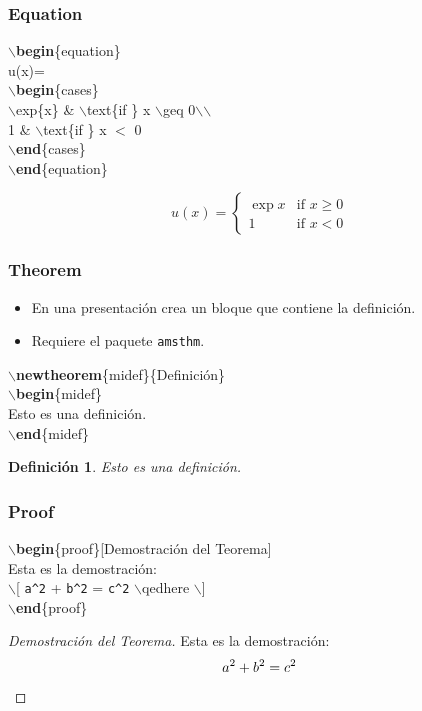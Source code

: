 \documentclass[aspectratio=1610]{beamer}%
\begin{document}
\begin{frame}[fragile]
\frametitle{\textbf{Equation}}
\justifying
 \begin{block}{}
$\backslash$\textbf{begin}\{equation\}\\
u(x)=\\
$\backslash$\textbf{begin}\{cases\}\\
$\backslash$exp\{x\}    \& $\backslash$text\{if \} x $\backslash$geq 0$\backslash$$\backslash$\\
 1 \& $\backslash$text\{if \} x $<$ 0\\
 $\backslash$\textbf{end}\{cases\}\\
$\backslash$\textbf{end}\{equation\}

\end{block}
\begin{equation}
u(x)=
\begin{cases}
\exp{x}    & \text{if } x \geq 0\\
 1 & \text{if } x < 0
 \end{cases}
\end{equation}
\end{frame}

\begin{frame}[fragile]
\frametitle{\textbf{Theorem}}
\justifying
 \begin{itemize}\justifying
  \item En una presentación crea un bloque que contiene la definición.
  \item Requiere el paquete \texttt{amsthm}.
\end{itemize}

\begin{block}{}
$\backslash$\textbf{newtheorem}\{midef\}\{Definición\}\\
$\backslash$\textbf{begin}\{midef\}\\
Esto es una definición.    \\
$\backslash$\textbf{end}\{midef\}
\end{block}

\newtheorem{midef}{Definición}
\begin{midef}
Esto es una definición.    
\end{midef}
\end{frame}

\begin{frame}[fragile]
\frametitle{\textbf{Proof}}
\justifying
 \begin{block}{}
$\backslash$\textbf{begin}\{proof\}[Demostración del Teorema]\\
    Esta es la demostración:\\
    $\backslash$[ \verb+a^2+ + \verb+b^2+ = \verb+c^2+ $\backslash$qedhere $\backslash$]\\
$\backslash$\textbf{end}\{proof\}
\end{block}
\begin{proof}[Demostración del Teorema]
    Esta es la demostración:
    \[ a^2 + b^2 = c^2 \qedhere \]
\end{proof}
\end{frame}
\end{document}

